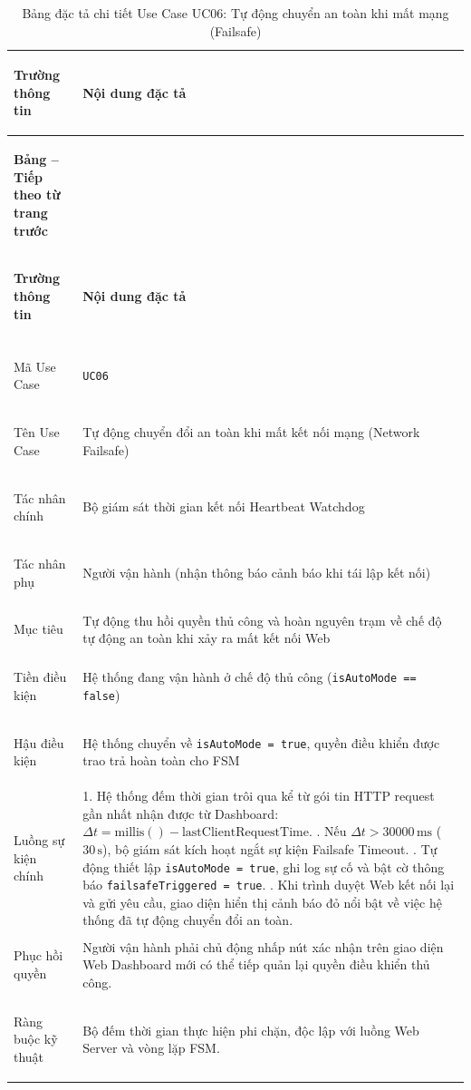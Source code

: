 \begingroup
\small
\renewcommand{\arraystretch}{1.2}
\begin{xltabular}{\textwidth}{|>{\bfseries\raggedright\arraybackslash}p{3.2cm}|X|}
\caption{Bảng đặc tả chi tiết Use Case UC06: Tự động chuyển an toàn khi mất mạng (Failsafe)} \label{tab:spec_uc06} \\
\hline
\textbf{Trường thông tin} & \textbf{Nội dung đặc tả} \\ \hline
\endfirsthead

{{\bfseries Bảng \thetable{} -- Tiếp theo từ trang trước}} \\
\hline
\textbf{Trường thông tin} & \textbf{Nội dung đặc tả} \\ \hline
\endhead

\hline {} \\ \hline
\endfoot

\hline
\endlastfoot
Mã Use Case & \texttt{UC06} \\ \hline
Tên Use Case & Tự động chuyển đổi an toàn khi mất kết nối mạng (Network Failsafe) \\ \hline
Tác nhân chính & Bộ giám sát thời gian kết nối Heartbeat Watchdog \\ \hline
Tác nhân phụ & Người vận hành (nhận thông báo cảnh báo khi tái lập kết nối) \\ \hline
Mục tiêu & Tự động thu hồi quyền thủ công và hoàn nguyên trạm về chế độ tự động an toàn khi xảy ra mất kết nối Web \\ \hline
Tiền điều kiện & Hệ thống đang vận hành ở chế độ thủ công (\texttt{isAutoMode == false}) \\ \hline
Hậu điều kiện & Hệ thống chuyển về \texttt{isAutoMode = true}, quyền điều khiển được trao trả hoàn toàn cho FSM \\ \hline
Luồng sự kiện chính & 
1. Hệ thống đếm thời gian trôi qua kể từ gói tin HTTP request gần nhất nhận được từ Dashboard: $\Delta t = \text{millis}() - \text{lastClientRequestTime}$. . Nếu $\Delta t > 30000\,\text{ms}$ ($30\,\text{s}$), bộ giám sát kích hoạt ngắt sự kiện Failsafe Timeout. . Tự động thiết lập \texttt{isAutoMode = true}, ghi log sự cố và bật cờ thông báo \texttt{failsafeTriggered = true}. . Khi trình duyệt Web kết nối lại và gửi yêu cầu, giao diện hiển thị cảnh báo đỏ nổi bật về việc hệ thống đã tự động chuyển đổi an toàn. \\ \hline
Phục hồi quyền & Người vận hành phải chủ động nhấp nút xác nhận trên giao diện Web Dashboard mới có thể tiếp quản lại quyền điều khiển thủ công. \\ \hline
Ràng buộc kỹ thuật & Bộ đếm thời gian thực hiện phi chặn, độc lập với luồng Web Server và vòng lặp FSM. \\ \hline

\end{xltabular}
\endgroup

